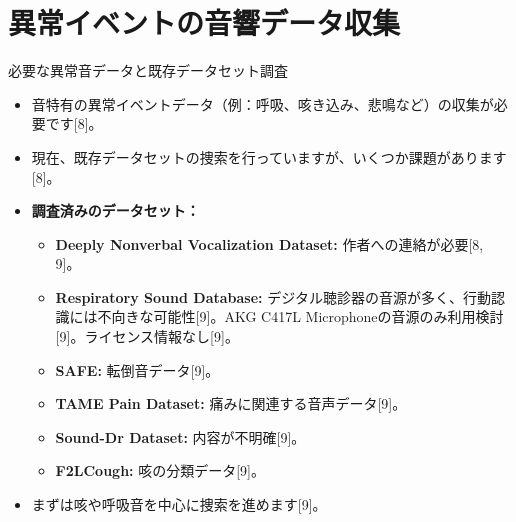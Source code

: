 \documentclass[unicode,12pt,aspectratio=169,dvipdfmx]{beamer}
\begin{document}
\section{異常イベントの音響データ収集} %
\begin{frame}{必要な異常音データと既存データセット調査} %
    \begin{itemize}
        \item 音特有の異常イベントデータ（例：呼吸、咳き込み、悲鳴など）の収集が必要です[8]。
        \item 現在、既存データセットの捜索を行っていますが、いくつか課題があります[8]。
        \item \textbf{調査済みのデータセット：}
        \begin{itemize}
            \item \textbf{Deeply Nonverbal Vocalization Dataset:} 作者への連絡が必要[8, 9]。
            \item \textbf{Respiratory Sound Database:} デジタル聴診器の音源が多く、行動認識には不向きな可能性[9]。AKG C417L Microphoneの音源のみ利用検討[9]。ライセンス情報なし[9]。
            \item \textbf{SAFE:} 転倒音データ[9]。
            \item \textbf{TAME Pain Dataset:} 痛みに関連する音声データ[9]。
            \item \textbf{Sound-Dr Dataset:} 内容が不明確[9]。
            \item \textbf{F2LCough:} 咳の分類データ[9]。
        \end{itemize}
        \item まずは咳や呼吸音を中心に捜索を進めます[9]。
    \end{itemize}
\end{frame}
\end{document}
